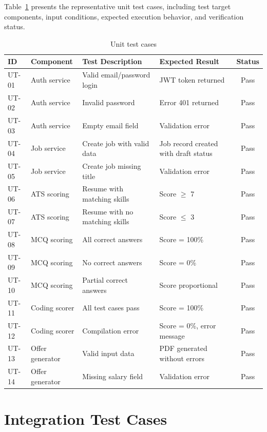 Table~\ref{tab:unit-tests} presents the representative unit test cases, including test target components, input conditions, expected execution behavior, and verification status.

\begin{table}[H]
\centering
\caption{Unit test cases}
\label{tab:unit-tests}
\small
\begin{tabularx}{\textwidth}{l X X X c}
\toprule
\textbf{ID} & \textbf{Component} & \textbf{Test Description} & \textbf{Expected Result} & \textbf{Status} \\
\midrule
UT-01 & Auth service & Valid email/password login & JWT token returned & Pass \\
UT-02 & Auth service & Invalid password & Error 401 returned & Pass \\
UT-03 & Auth service & Empty email field & Validation error & Pass \\
UT-04 & Job service & Create job with valid data & Job record created with draft status & Pass \\
UT-05 & Job service & Create job missing title & Validation error & Pass \\
UT-06 & ATS scoring & Resume with matching skills & Score $\ge$ 7 & Pass \\
UT-07 & ATS scoring & Resume with no matching skills & Score $\le$ 3 & Pass \\
UT-08 & MCQ scoring & All correct answers & Score = 100\% & Pass \\
UT-09 & MCQ scoring & No correct answers & Score = 0\% & Pass \\
UT-10 & MCQ scoring & Partial correct answers & Score proportional & Pass \\
UT-11 & Coding scorer & All test cases pass & Score = 100\% & Pass \\
UT-12 & Coding scorer & Compilation error & Score = 0\%, error message & Pass \\
UT-13 & Offer generator & Valid input data & PDF generated without errors & Pass \\
UT-14 & Offer generator & Missing salary field & Validation error & Pass \\
\bottomrule
\end{tabularx}
\end{table}

\section{Integration Test Cases}
\label{sec:integration-tests}

